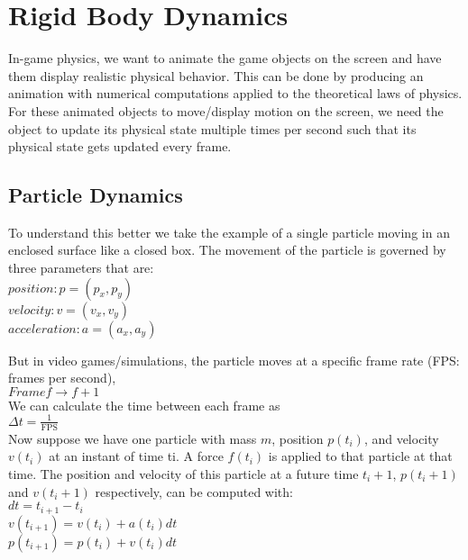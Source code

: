 \section{Rigid Body Dynamics}
    In-game physics, we want to animate the game objects on the screen and have them display realistic physical behavior. This can be done by producing an animation with numerical computations applied to the theoretical laws of physics. For these animated objects to move/display motion on the screen, we need the object to update its physical state multiple times per second such that its physical state gets updated every frame. 

        \subsection{Particle Dynamics}
        To understand this better we take the example of a single particle moving in an enclosed surface like a closed box. The movement of the particle is governed by three parameters that are: \\ 
        \(position: p=(p_x, p_y)\) \\
        \(velocity: v=(v_x, v_y)\) \\
        \(acceleration: a=(a_x, a_y)\)

        But in video games/simulations, the particle moves at a specific frame rate (FPS: frames per second), \\ 
        \(Frame f \rightarrow f+1\)
        \vspace{6pt}
        \\
        We can calculate the time between each frame as \\
        \(\Delta t = \frac{1}{\text{FPS}}\)
        \vspace{6pt}
        \\
        Now suppose we have one particle with mass \(m\), position \(p(t_i)\), and velocity \(v(t_i)\) at an instant of time ti. A force \(f(t_i)\) is applied to that particle at that time. The position and velocity of this particle at a future time \(t_i + 1\), \(p(t_i + 1)\) and \(v(t_i + 1)\) respectively, can be computed with: \\
        \(dt = t_{i+1} - t_i\) \\
        \(v(t_{i+1}) = v(t_i) + a(t_i)dt\) \\ 
        \(p(t_{i+1}) = p(t_i) + v(t_i)dt\)
        
